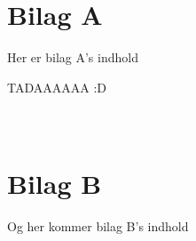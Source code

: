 \newpage
\appendix
\section{\\Bilag A} \label{App:BilagA}

Her er bilag A's indhold 


TADAAAAAA :D 

\newpage
\section{\\Bilag B} \label{App:BilagB}

Og her kommer bilag B's indhold 